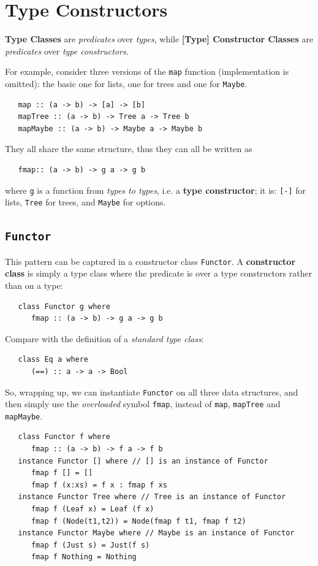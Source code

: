 \section{Type Constructors}
\textbf{Type Classes} are \textit{predicates} over \textit{types},
while \textbf{[Type] Constructor Classes} are \textit{predicates} over \textit{type constructors}.

For example, consider three versions of the \lstinline|map| function (implementation is omitted): the basic one for lists, one for trees and one for \lstinline|Maybe|.
\begin{lstlisting}
   map :: (a -> b) -> [a] -> [b]
   mapTree :: (a -> b) -> Tree a -> Tree b
   mapMaybe :: (a -> b) -> Maybe a -> Maybe b
\end{lstlisting}
They all share the same structure, thus they can all be written as
\begin{lstlisting}
   fmap:: (a -> b) -> g a -> g b
\end{lstlisting}
where \lstinline|g| is a function from \textit{types to types}, i.e.
a \textbf{type constructor};
it is:
\lstinline|[-]| for lists, \lstinline|Tree| for trees, and \lstinline|Maybe| for options.

\subsection{\texttt{Functor}}
This pattern can be captured in a constructor
class \lstinline|Functor|. 
A \textbf{constructor class} is simply a type class where
the predicate is over a type constructors rather
than on a type:
\begin{lstlisting}
   class Functor g where
      fmap :: (a -> b) -> g a -> g b
\end{lstlisting}

Compare with the definition of a \textit{standard type class}:
\begin{lstlisting}
   class Eq a where
      (==) :: a -> a -> Bool
\end{lstlisting}

So, wrapping up, we can instantiate \lstinline|Functor| on all three data structures,
and then simply use the \textit{overloaded} symbol \lstinline|fmap|, instead of \lstinline|map|, \lstinline|mapTree| and \lstinline|mapMaybe|.
\begin{lstlisting}
   class Functor f where
      fmap :: (a -> b) -> f a -> f b
   instance Functor [] where // [] is an instance of Functor
      fmap f [] = []
      fmap f (x:xs) = f x : fmap f xs
   instance Functor Tree where // Tree is an instance of Functor
      fmap f (Leaf x) = Leaf (f x)
      fmap f (Node(t1,t2)) = Node(fmap f t1, fmap f t2)
   instance Functor Maybe where // Maybe is an instance of Functor
      fmap f (Just s) = Just(f s)
      fmap f Nothing = Nothing
\end{lstlisting}
